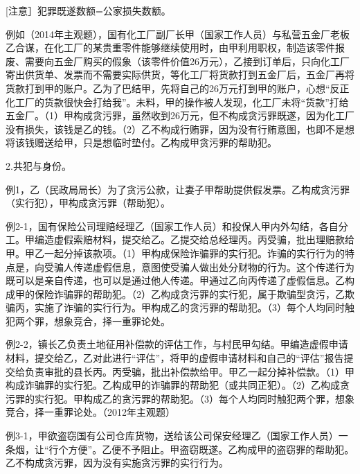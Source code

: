 [注意］犯罪既遂数额=公家损失数额。

例如（2014年主观题），国有化工厂副厂长甲（国家工作人员）与私营五金厂老板乙合谋，在化工厂的某贵重零件能够继续使用时，由甲利用职权，制造该零件报废、需要向五金厂购买的假象（该零件价值26万元），乙接到订单后，只向化工厂寄出供货单、发票而不需要实际供货，等化工厂将货款打到五金厂后，五金厂再将货款打到甲的账户。乙为了巴结甲，先将自己的26万元打到甲的账户，心想“反正化工厂的货款很快会打给我”。未料，甲的操作被人发现，化工厂未将“货款”打给五金厂。（1）甲构成贪污罪，虽然收到26万元，但不构成贪污罪既遂，因为化工厂没有损失，该钱是乙的钱。（2）乙不构成行贿罪，因为没有行贿意图，也即不是想将该钱赠送给甲，只是想临时垫付。乙构成甲贪污罪的帮助犯。

2.共犯与身份。



例1，乙（民政局局长）为了贪污公款，让妻子甲帮助提供假发票。乙构成贪污罪（实行犯），甲构成贪污罪（帮助犯）。

例2-1，国有保险公司理赔经理乙（国家工作人员）和投保人甲内外勾结，各自分工。甲编造虚假索赔材料，提交给乙。乙提交给总经理丙。丙受骗，批出理赔款给甲。甲乙一起分掉该款项。（1）甲构成保险诈骗罪的实行犯。诈骗的实行行为的特点是，向受骗人传递虚假信息，意图使受骗人做出处分财物的行为。这个传递行为既可以是亲自传递，也可以是通过他人传递。甲通过乙向丙传递了虚假信息。乙构成甲的保险诈骗罪的帮助犯。（2）乙构成贪污罪的实行犯，属于欺骗型贪污，乙欺骗丙，实施了诈骗的实行行为。甲构成乙的贪污罪的帮助犯。（3）每个人均同时触犯两个罪，想象竞合，择一重罪论处。

例2-2，镇长乙负责土地征用补偿款的评估工作，与村民甲勾结。甲编造虚假申请材料，提交给乙，乙对此进行“评估”，将甲的虚假申请材料和自己的“评估”报告提交给负责审批的县长丙。丙受骗，批出补偿款给甲。甲乙一起分掉补偿款。（1）甲构成诈骗罪的实行犯。乙构成甲的诈骗罪的帮助犯（或共同正犯）。（2）乙构成贪污罪的实行犯。甲构成乙的贪污罪的帮助犯。（3）每个人均同时触犯两个罪，想象竞合，择一重罪论处。（2012年主观题）

例3-1，甲欲盗窃国有公司仓库货物，送给该公司保安经理乙（国家工作人员）一条烟，让“行个方便”。乙便不予阻止。甲盗窃既遂。乙构成甲的盗窃罪的帮助犯。乙不构成贪污罪，因为没有实施贪污罪的实行行为。

